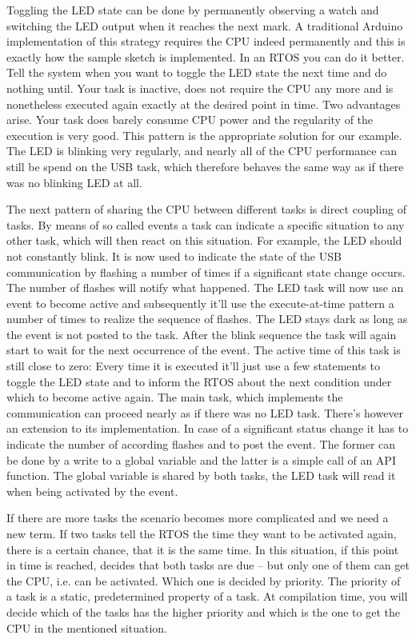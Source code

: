 Toggling the LED state can be done by permanently observing a watch and
switching the LED output when it reaches the next mark. A traditional
Arduino implementation of this strategy requires the CPU indeed
permanently and this is exactly how the sample sketch  is
implemented. In an RTOS you can do it better. Tell the system when you
want to toggle the LED state the next time and do nothing until. Your task
is inactive, does not require the CPU any more and is nonetheless executed
again exactly at the desired point in time. Two advantages arise. Your
task does barely consume CPU power and the regularity of the execution is
very good. This pattern is the appropriate solution for our example. The
LED is blinking very regularly, and nearly all of the CPU performance can
still be spend on the USB task, which therefore behaves the same way as if
there was no blinking LED at all.

The next pattern of sharing the CPU between different tasks is direct
coupling of tasks. By means of so called events a task can indicate a
specific situation to any other task, which will then react on this
situation. For example, the LED should not constantly blink. It is now
used to indicate the state of the USB communication by flashing a number
of times if a significant state change occurs. The number of flashes will
notify what happened. The LED task will now use an event to become active
and subsequently it'll use the execute-at-time pattern a number of times
to realize the sequence of flashes. The LED stays dark as long as the
event is not posted to the task. After the blink sequence the task will
again start to wait for the next occurrence of the event. The active time of
this task is still close to zero: Every time it is executed it'll just use
a few statements to toggle the LED state and to inform the RTOS about the
next condition under which to become active again. The main task, which
implements the communication can proceed nearly as if there was no LED
task. There's however an extension to its implementation. In case of a
significant status change it has to indicate the number of according
flashes and to post the event. The former can be done by a write to a
global variable and the latter is a simple call of an \rtos{} API
function. The global variable is shared by both tasks, the LED task will
read it when being activated by the event.

If there are more tasks the scenario becomes more complicated and we need
a new term. If two tasks tell the RTOS the time they want to be activated
again, there is a certain chance, that it is the same time. In this
situation, if this point in time is reached, \rtos{} decides that both
tasks are due -- but only one of them can get the CPU, i.e. can be
activated. Which one is decided by priority. The priority of a task is a
static, predetermined property of a task. At compilation time, you will
decide which of the tasks has the higher priority and which is the one to
get the CPU in the mentioned situation.

